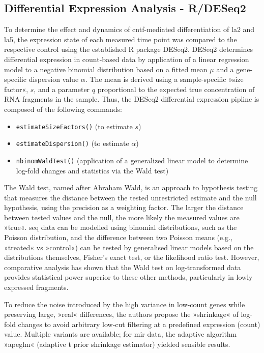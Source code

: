 \subsection{Differential Expression Analysis - R/DESeq2} \label{sec:cellculture:deseq}
To determine the effect and dynamics of \ac{cntf}-mediated differentiation of \ac{la2} and \ac{la5}, the expression state of each measured time point was compared to the respective control using the established R package DESeq2\cite{Love2014}. DESeq2 determines differential expression in count-based data by application of a linear regression model to a negative binomial distribution based on a fitted mean $\mu$ and a gene-specific dispersion value $\alpha$. The mean is derived using a sample-specific »size factor«, $s$, and a parameter $q$ proportional to the expected true concentration of RNA fragments in the sample. Thus, the DESeq2 differential expression pipline is composed of the following commands:
\begin{itemize}
\item \texttt{estimateSizeFactors()} (to estimate $s$)
\item \texttt{estimateDispersion()} (to estimate $\alpha$)
\item \texttt{nbinomWaldTest()} (application of a generalized linear model to determine log-fold changes and statistics via the Wald test)
\end{itemize}
The Wald test, named after Abraham Wald, is an approach to hypothesis testing that measures the distance between the tested unrestricted estimate and the null hypothesis, using the precision as a weighting factor. The larger the distance between tested values and the null, the more likely the measured values are »true«. \ac{seq} data can be modelled using binomial distributions\cite{Bullard2010}, such as the Poisson distribution, and the difference between two Poisson means (e.g., »treated« vs »control«) can be tested by generalised linear models based on the distributions themselves, Fisher's exact test, or the likelihood ratio test. However, comparative analysis has shown that the Wald test on log-transformed data provides statistical power superior to these other methods\cite{Chen2011}, particularly in lowly expressed fragments.

To reduce the noise introduced by the high variance in low-count genes while preserving large, »real« differences, the authors propose the »shrinkage« of log-fold changes to avoid arbitrary low-cut filtering at a predefined expression (count) value. Multiple variants are available; for \ac{mir} data, the adaptive algorithm »apeglm«\cite{Zhu2019} (adaptive t prior shrinkage estimator) yielded sensible results. 

